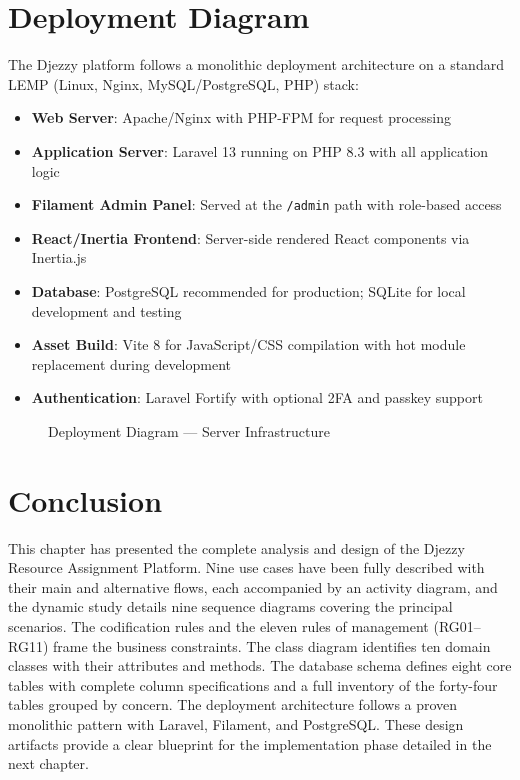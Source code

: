 \documentclass{bts-report}
\begin{document}
\section{Deployment Diagram}

The Djezzy platform follows a monolithic deployment architecture on a standard LEMP (Linux, Nginx, MySQL/PostgreSQL, PHP) stack:

\begin{itemize}
  \item \textbf{Web Server}: Apache/Nginx with PHP-FPM for request processing
  \item \textbf{Application Server}: Laravel 13 running on PHP 8.3 with all application logic
  \item \textbf{Filament Admin Panel}: Served at the \texttt{/admin} path with role-based access
  \item \textbf{React/Inertia Frontend}: Server-side rendered React components via Inertia.js
  \item \textbf{Database}: PostgreSQL recommended for production; SQLite for local development and testing
  \item \textbf{Asset Build}: Vite 8 for JavaScript/CSS compilation with hot module replacement during development
  \item \textbf{Authentication}: Laravel Fortify with optional 2FA and passkey support
\end{itemize}

\begin{figure}[htbp]
  \centering
  \resizebox{0.9\textwidth}{!}{}
  \caption{Deployment Diagram --- Server Infrastructure}
  \label{fig:deployment}
\end{figure}

\section*{Conclusion}
This chapter has presented the complete analysis and design of the Djezzy Resource Assignment Platform. Nine use cases have been fully described with their main and alternative flows, each accompanied by an activity diagram, and the dynamic study details nine sequence diagrams covering the principal scenarios. The codification rules and the eleven rules of management (RG01--RG11) frame the business constraints. The class diagram identifies ten domain classes with their attributes and methods. The database schema defines eight core tables with complete column specifications and a full inventory of the forty-four tables grouped by concern. The deployment architecture follows a proven monolithic pattern with Laravel, Filament, and PostgreSQL. These design artifacts provide a clear blueprint for the implementation phase detailed in the next chapter.
\end{document}

